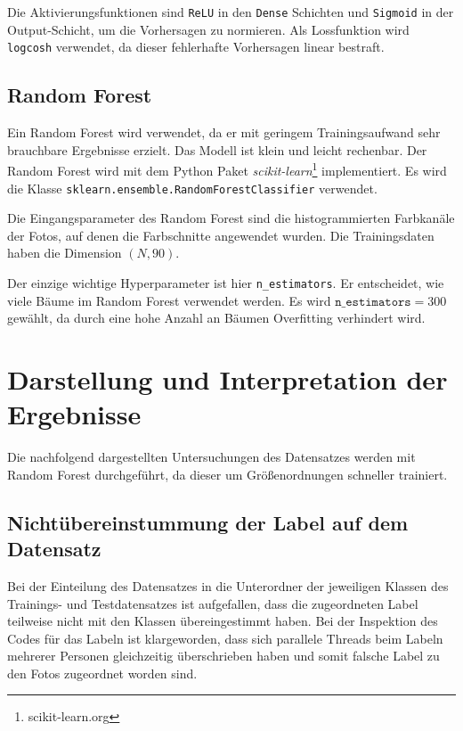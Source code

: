 Die Aktivierungsfunktionen sind \texttt{ReLU} in den \texttt{Dense}
Schichten und \texttt{Sigmoid} in der Output-Schicht, um die Vorhersagen
zu normieren. Als Lossfunktion wird \texttt{logcosh} verwendet, da
dieser fehlerhafte Vorhersagen linear bestraft.

\hypertarget{random-forest}{%
\subsection{Random Forest}\label{random-forest}}

Ein Random Forest wird verwendet, da er mit geringem Trainingsaufwand
sehr brauchbare Ergebnisse erzielt. Das Modell ist klein und leicht
rechenbar. Der Random Forest wird mit dem Python Paket
\emph{scikit-learn}\footnote{scikit-learn.org} implementiert. Es wird
die Klasse \linebreak\texttt{sklearn.ensemble.RandomForestClassifier} verwendet.

Die Eingangsparameter des Random Forest sind die histogrammierten
Farbkanäle der Fotos, auf denen die Farbschnitte angewendet wurden. Die
Trainingsdaten haben die Dimension $(N, 90)$.

Der einzige wichtige Hyperparameter ist hier \texttt{n\_estimators}. Er
entscheidet, wie viele Bäume im Random Forest verwendet werden. Es wird
$\texttt{n\_estimators} = 300$ gewählt, da durch eine hohe Anzahl an
Bäumen Overfitting verhindert wird.

\hypertarget{darstellung-und-interpretation-der-ergebnisse}{%
\section{Darstellung und Interpretation der
Ergebnisse}\label{darstellung-und-interpretation-der-ergebnisse}}

Die nachfolgend dargestellten Untersuchungen des Datensatzes werden mit
Random Forest durchgeführt, da dieser um Größenordnungen schneller
trainiert.

\hypertarget{nichtuxfcbereinstummung-der-label-auf-dem-datensatz}{%
\subsection{Nichtübereinstummung der Label auf dem
Datensatz}\label{nichtuxfcbereinstummung-der-label-auf-dem-datensatz}}

Bei der Einteilung des Datensatzes in die Unterordner der jeweiligen
Klassen des Trainings- und Testdatensatzes ist aufgefallen, dass die
zugeordneten Label teilweise nicht mit den Klassen übereingestimmt
haben. Bei der Inspektion des Codes für das Labeln ist klargeworden,
dass sich parallele Threads beim Labeln mehrerer Personen gleichzeitig
überschrieben haben und somit falsche Label zu den Fotos zugeordnet
worden sind.


